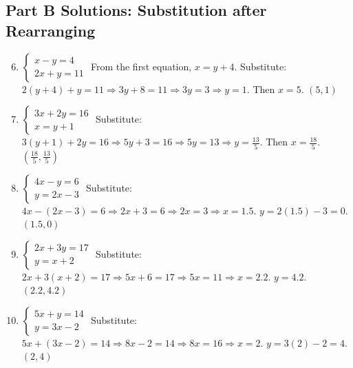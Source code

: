 \documentclass[14pt]{extarticle}
\begin{document}
\subsection*{Part B Solutions: Substitution after Rearranging}
\begin{enumerate}
    \setcounter{enumi}{5}
    \item \(\begin{cases} x - y = 4 \\ 2x + y = 11 \end{cases}\)  
    From the first equation, \(x = y + 4\).  
    Substitute: \(2(y + 4) + y = 11 \Rightarrow 3y + 8 = 11 \Rightarrow 3y = 3 \Rightarrow y = 1\).  
    Then \(x = 5\).  
    \(\boxed{(5, 1)}\)

    \item \(\begin{cases} 3x + 2y = 16 \\ x = y + 1 \end{cases}\)  
    Substitute: \(3(y + 1) + 2y = 16 \Rightarrow 5y + 3 = 16 \Rightarrow 5y = 13 \Rightarrow y = \tfrac{13}{5}\).  
    Then \(x = \tfrac{18}{5}\).  
    \(\boxed{(\tfrac{18}{5}, \tfrac{13}{5})}\)

    \item \(\begin{cases} 4x - y = 6 \\ y = 2x - 3 \end{cases}\)  
    Substitute: \(4x - (2x - 3) = 6 \Rightarrow 2x + 3 = 6 \Rightarrow 2x = 3 \Rightarrow x = 1.5\).  
    \(y = 2(1.5) - 3 = 0\).  
    \(\boxed{(1.5, 0)}\)

    \item \(\begin{cases} 2x + 3y = 17 \\ y = x + 2 \end{cases}\)  
    Substitute: \(2x + 3(x + 2) = 17 \Rightarrow 5x + 6 = 17 \Rightarrow 5x = 11 \Rightarrow x = 2.2\).  
    \(y = 4.2\).  
    \(\boxed{(2.2, 4.2)}\)

    \item \(\begin{cases} 5x + y = 14 \\ y = 3x - 2 \end{cases}\)  
    Substitute: \(5x + (3x - 2) = 14 \Rightarrow 8x - 2 = 14 \Rightarrow 8x = 16 \Rightarrow x = 2\).  
    \(y = 3(2) - 2 = 4\).  
    \(\boxed{(2, 4)}\)
\end{enumerate}
\end{document}
